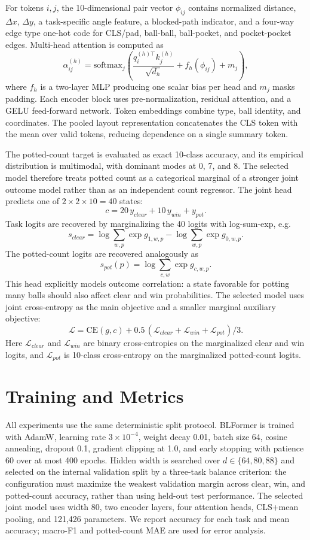 \documentclass[12pt]{article}
\begin{document}
For tokens $i,j$, the 10-dimensional pair vector $\phi_{ij}$ contains normalized distance, $\Delta x$, $\Delta y$, a task-specific angle feature, a blocked-path indicator, and a four-way edge type one-hot code for CLS/pad, ball-ball, ball-pocket, and pocket-pocket edges.  Multi-head attention is computed as
\[
  \alpha_{ij}^{(h)}
  = \mathrm{softmax}_j\left(
      \frac{q_i^{(h)\top} k_j^{(h)}}{\sqrt{d_h}}
      + f_h(\phi_{ij}) + m_j
    \right),
\]
where $f_h$ is a two-layer MLP producing one scalar bias per head and $m_j$ masks padding.  Each encoder block uses pre-normalization, residual attention, and a GELU feed-forward network.  Token embeddings combine type, ball identity, and coordinates.  The pooled layout representation concatenates the CLS token with the mean over valid tokens, reducing dependence on a single summary token.

The potted-count target is evaluated as exact 10-class accuracy, and its empirical distribution is multimodal, with dominant modes at 0, 7, and 8.  The selected model therefore treats potted count as a categorical marginal of a stronger joint outcome model rather than as an independent count regressor.  The joint head predicts one of $2\times2\times10=40$ states:
\[
  c = 20\,y_{clear} + 10\,y_{win} + y_{pot}.
\]
Task logits are recovered by marginalizing the 40 logits with log-sum-exp, e.g.
\[
  s_{clear} =
  \log\sum_{w,p}\exp g_{1,w,p}
  - \log\sum_{w,p}\exp g_{0,w,p}.
\]
The potted-count logits are recovered analogously as
\[
  s_{pot}(p)=\log\sum_{c,w}\exp g_{c,w,p}.
\]
This head explicitly models outcome correlation: a state favorable for potting many balls should also affect clear and win probabilities.  The selected model uses joint cross-entropy as the main objective and a smaller marginal auxiliary objective:
\[
  \mathcal{L}= \mathrm{CE}(g,c)
  + 0.5\,(\mathcal{L}_{clear}+\mathcal{L}_{win}+\mathcal{L}_{pot})/3.
\]
Here $\mathcal{L}_{clear}$ and $\mathcal{L}_{win}$ are binary cross-entropies on the marginalized clear and win logits, and $\mathcal{L}_{pot}$ is 10-class cross-entropy on the marginalized potted-count logits.

\section{Training and Metrics}
All experiments use the same deterministic split protocol.  BLFormer is trained with AdamW, learning rate $3\times10^{-4}$, weight decay 0.01, batch size 64, cosine annealing, dropout 0.1, gradient clipping at 1.0, and early stopping with patience 60 over at most 400 epochs.  Hidden width is searched over $d\in\{64,80,88\}$ and selected on the internal validation split by a three-task balance criterion: the configuration must maximize the weakest validation margin across clear, win, and potted-count accuracy, rather than using held-out test performance.  The selected joint model uses width 80, two encoder layers, four attention heads, CLS+mean pooling, and 121,426 parameters.  We report accuracy for each task and mean accuracy; macro-F1 and potted-count MAE are used for error analysis.
\end{document}
